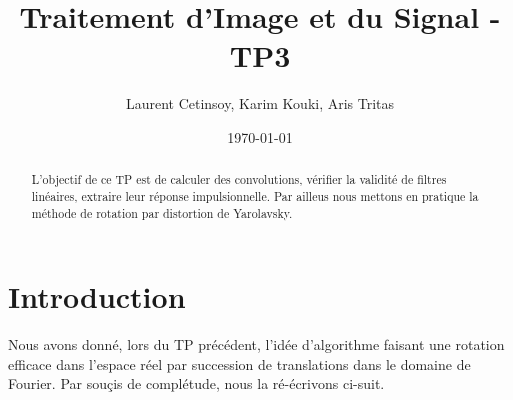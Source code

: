 \documentclass[12pt]{article}
\title{Traitement d'Image et du Signal - TP3}
\author{Laurent Cetinsoy, Karim Kouki, Aris Tritas }
\date{\today}
\begin{document}
\maketitle

\begin{abstract}
L'objectif de ce TP est de calculer des convolutions, vérifier la validité de filtres linéaires, extraire leur réponse impulsionnelle. Par ailleus nous mettons en pratique la méthode de rotation par distortion de Yarolavsky.
\end{abstract}

\section*{Introduction}
Nous avons donné, lors du TP précédent, l'idée d'algorithme faisant une rotation efficace dans l'espace réel par succession de translations dans le domaine de Fourier. Par souçis de complétude, nous la ré-écrivons ci-suit.
\end{document}
